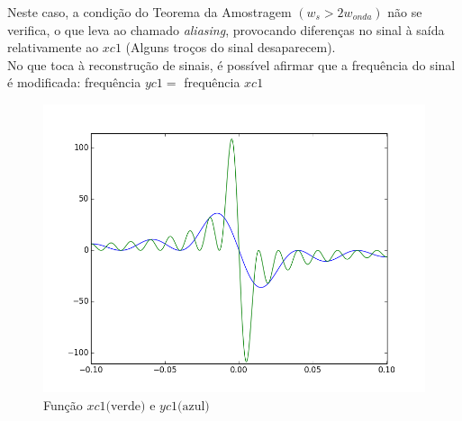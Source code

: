 \documentclass[a4paper, 12pt]{article}
\begin{document}
\begin{itemize}
          Neste caso, a condição do Teorema da Amostragem $(w_{s}>2w_{onda})$ não se verifica, o que leva ao chamado \textit{aliasing}, provocando diferenças no sinal à saída relativamente ao $xc1$ (Alguns troços do sinal desaparecem).\\
          No que toca à reconstrução de sinais, é possível afirmar que a frequência do sinal é modificada: frequência $yc1 =$ frequência $xc1$
          \begin{figure}[!ht]
              \includegraphics[width = 13.5cm]{images/Graf5.png}
              \vspace{-15px}
              \caption{Função $xc1 \textrm{(verde) e } yc1 \textrm{(azul)}$}
          \end{figure}
\end{itemize}
\end{document}

